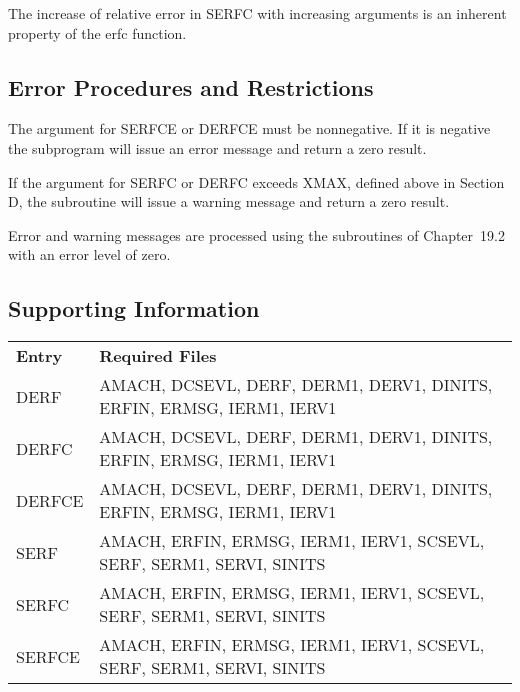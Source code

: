 \documentclass[twoside]{MATH77}
\begin{document}
The increase of relative error in SERFC with increasing arguments is an
inherent property of the erfc function.




\subsection{Error Procedures and Restrictions}

The argument for SERFCE or DERFCE must be nonnegative. If it is negative the
subprogram will issue an error message and return a zero result.

If the argument for SERFC or DERFC exceeds XMAX, defined above in Section D,
the subroutine will issue a warning message and return a zero result.

Error and warning messages are processed using the subroutines of
Chapter~19.2 with an error level of zero.

\subsection{Supporting Information}

\begin{tabular}{@{\bf}l@{\hspace{5pt}}l}
\bf Entry & \hspace{.35in} {\bf Required Files}\vspace{2pt} \\
DERF & \parbox[t]{2.7in}{ \raggedright
AMACH, DCSEVL, DERF, DERM1, DERV1, DINITS, ERFIN, ERMSG, IERM1, IERV1\rule[-5pt]{0pt}{8pt}}\\DERFC & \parbox[t]{2.7in}{ \raggedright
AMACH, DCSEVL, DERF, DERM1, DERV1, DINITS, ERFIN, ERMSG, IERM1, IERV1\rule[-5pt]{0pt}{8pt}}\\DERFCE & \parbox[t]{2.7in}{ \raggedright
AMACH, DCSEVL, DERF, DERM1, DERV1, DINITS, ERFIN, ERMSG, IERM1, IERV1\rule[-5pt]{0pt}{8pt}}\\SERF & \parbox[t]{2.7in}{ \raggedright
AMACH, ERFIN, ERMSG, IERM1, IERV1, SCSEVL, SERF, SERM1, SERVI, SINITS\rule[-5pt]{0pt}{8pt}}\\SERFC & \parbox[t]{2.7in}{ \raggedright
AMACH, ERFIN, ERMSG, IERM1, IERV1, SCSEVL, SERF, SERM1, SERVI, SINITS\rule[-5pt]{0pt}{8pt}}\\SERFCE & \parbox[t]{2.7in}{ \raggedright
AMACH, ERFIN, ERMSG, IERM1, IERV1, SCSEVL, SERF, SERM1, SERVI, SINITS\rule[-5pt]{0pt}{8pt}}\\\end{tabular}
\end{document}
